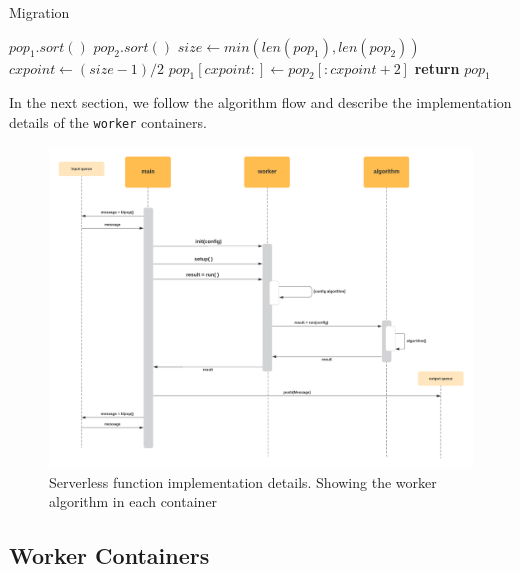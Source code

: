 \documentclass[review]{elsarticle}
\begin{document}
\begin{algorithm}
    \caption{Migration}
    \label{alg:migration}
    \begin{algorithmic}[1]
            \State $pop_1.sort()$
            \State $pop_2.sort()$
            \State $size\gets min(len(pop_1), len(pop_2))$
            \State $cxpoint\gets (size-1)/2$
            \State $pop_1[cxpoint:]\gets pop_2[:cxpoint+2]$
            \State \textbf{return} $pop_1$
        \EndProcedure 
    \end{algorithmic}
\end{algorithm}



In the next section, we follow the algorithm flow and describe the 
implementation details of the \texttt{worker} containers. 

\begin{figure}[ht]
    \centering
    \includegraphics[width=\textwidth]{worker_new}
    \caption{Serverless function implementation details. Showing the worker algorithm in each container}
    \label{fig:worker}
\end{figure}




\subsection{Worker Containers} 
\label{workers}
\end{document}
